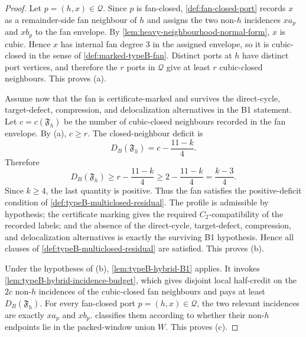 \documentclass[11pt]{article}
\begin{document}
\begin{proof}
Let \(p=(h,x)\in\mathcal Q\).  Since \(p\) is fan-closed,
\cref{def:fan-closed-port} records \(x\) as a remainder-side fan neighbour of
\(h\) and assigns the two non-\(h\) incidences \(xa_p\) and \(xb_p\) to the fan
envelope.  By \cref{lem:heavy-neighbourhood-normal-form}, \(x\) is cubic.
Hence \(x\) has internal fan degree \(3\) in the assigned envelope, so it is
cubic-closed in the sense of \cref{def:marked-typeB-fan}.  Distinct ports at
\(h\) have distinct port vertices, and therefore the \(r\) ports in
\(\mathcal Q\) give at least \(r\) cubic-closed neighbours.  This proves (a).

Assume now that the fan is certificate-marked and survives the direct-cycle,
target-defect, compression, and delocalization alternatives in the B1 statement.
Let \(c=c(\mathfrak F_h)\) be the number of cubic-closed neighbours recorded in
the fan envelope.  By (a), \(c\ge r\).  The closed-neighbour deficit is
\[
D_B(\mathfrak F_h)=c-\frac{11-k}{4}.
\]
Therefore
\[
D_B(\mathfrak F_h)
\ge
r-\frac{11-k}{4}
\ge
2-\frac{11-k}{4}
=
\frac{k-3}{4}.
\]
Since \(k\ge4\), the last quantity is positive.  Thus the fan satisfies the
positive-deficit condition of \cref{def:typeB-multiclosed-residual}.  The
profile is admissible by hypothesis; the certificate marking gives the required
\(C_2\)-compatibility of the recorded labels; and the absence of the
direct-cycle, target-defect, compression, and delocalization alternatives is
exactly the surviving B1 hypothesis.  Hence all clauses of
\cref{def:typeB-multiclosed-residual} are satisfied.  This proves (b).

Under the hypotheses of (b), \cref{lem:typeB-hybrid-B1} applies.  It invokes
\cref{lem:typeB-hybrid-incidence-budget}, which gives disjoint local half-credit
on the \(2c\) non-\(h\) incidences of the cubic-closed fan neighbours and pays
at least \(D_B(\mathfrak F_h)\).  For every fan-closed port
\(p=(h,x)\in\mathcal Q\), the two relevant incidences are exactly \(xa_p\) and
\(xb_p\).   classifies them according
to whether their non-\(h\) endpoints lie in the packed-window union \(W\).  This
proves (c).

\end{proof}
\end{document}
